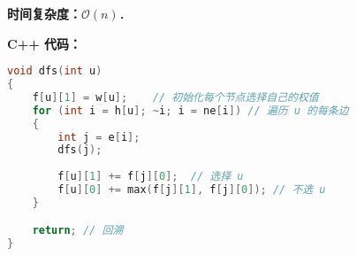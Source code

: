 \textbf{时间复杂度：}$\mathcal{O}(n)$．

\textbf{C++ 代码：}

\begin{lstlisting}[language=cpp]
void dfs(int u)
{
    f[u][1] = w[u];    // 初始化每个节点选择自己的权值
    for (int i = h[u]; ~i; i = ne[i]) // 遍历 u 的每条边
    {
        int j = e[i];
        dfs(j);
        
        f[u][1] += f[j][0];  // 选择 u
        f[u][0] += max(f[j][1], f[j][0]); // 不选 u
    }

    return; // 回溯
}

\end{lstlisting}


